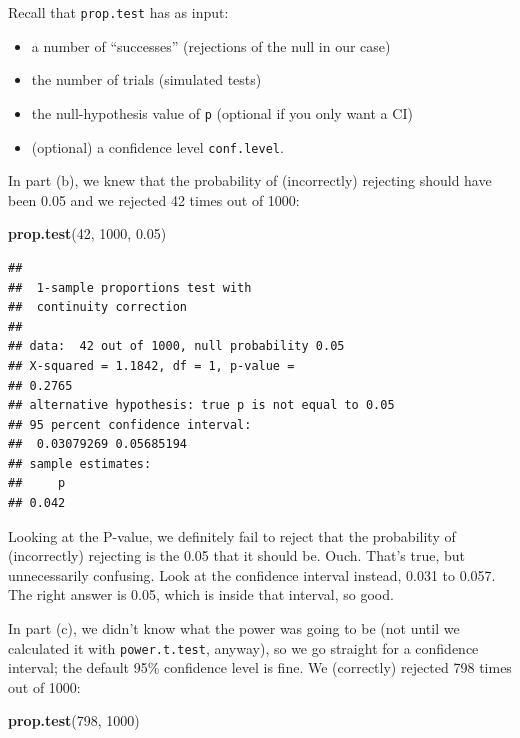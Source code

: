 \documentclass[]{tufte-book}
\newenvironment{Shaded}{}{}
\newcommand{\DecValTok}[1]{\textcolor[rgb]{0.25,0.63,0.44}{#1}}
\newcommand{\FloatTok}[1]{\textcolor[rgb]{0.25,0.63,0.44}{#1}}
\newcommand{\KeywordTok}[1]{\textcolor[rgb]{0.00,0.44,0.13}{\textbf{#1}}}
\newcommand{\NormalTok}[1]{#1}
\theoremstyle{definition}
\theoremstyle{definition}
\theoremstyle{definition}
\theoremstyle{remark}
\begin{document}
Recall that \texttt{prop.test} has as input:

\begin{itemize}
\item
  a number of ``successes'' (rejections of the null in our case)
\item
  the number of trials (simulated tests)
\item
  the null-hypothesis value of \texttt{p} (optional if you only want a
  CI)
\item
  (optional) a confidence level \texttt{conf.level}.
\end{itemize}

In part (b), we knew that the probability of (incorrectly) rejecting
should have been 0.05 and we rejected 42 times out of 1000:

\begin{Shaded}
\begin{Highlighting}[]
\KeywordTok{prop.test}\NormalTok{(}\DecValTok{42}\NormalTok{, }\DecValTok{1000}\NormalTok{, }\FloatTok{0.05}\NormalTok{)}
\end{Highlighting}
\end{Shaded}

\begin{verbatim}
## 
##  1-sample proportions test with
##  continuity correction
## 
## data:  42 out of 1000, null probability 0.05
## X-squared = 1.1842, df = 1, p-value =
## 0.2765
## alternative hypothesis: true p is not equal to 0.05
## 95 percent confidence interval:
##  0.03079269 0.05685194
## sample estimates:
##     p 
## 0.042
\end{verbatim}

Looking at the P-value, we definitely fail to reject that the
probability of (incorrectly) rejecting is the 0.05 that it should be.
Ouch. That's true, but unnecessarily confusing. Look at the confidence
interval instead, 0.031 to 0.057. The right answer is 0.05, which is
inside that interval, so good.

In part (c), we didn't know what the power was going to be (not until we
calculated it with \texttt{power.t.test}, anyway), so we go straight for
a confidence interval; the default 95\% confidence level is fine. We
(correctly) rejected 798 times out of 1000:

\begin{Shaded}
\begin{Highlighting}[]
\KeywordTok{prop.test}\NormalTok{(}\DecValTok{798}\NormalTok{, }\DecValTok{1000}\NormalTok{)}
\end{Highlighting}
\end{Shaded}
\end{document}
